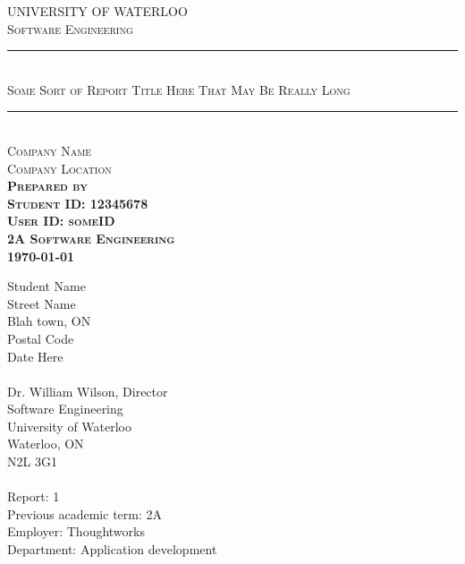\documentclass[pdftex,12pt,a4paper]{article}
\newcommand{\HRule}{\rule{\linewidth}{0.5mm}}
\begin{document}
\begin{titlepage}
\begin{center}

\textsc{\large UNIVERSITY OF WATERLOO} \\ [0.5 cm]
\textsc{\large Software Engineering} \\ [4.0 cm]

\HRule \\ [0.4 cm]
\textsc{\huge Some Sort of Report Title Here That May Be Really Long} \\ [0.4 cm]
\HRule \\ [4.0 cm]

\textsc{Company Name} \\
\textsc{Company Location} \\

\textsc \bf{Prepared by} \\ [0.3 cm]
\textsc {Student ID: 12345678} \\
\textsc {User ID: someID} \\
\textsc {2A Software Engineering} \\
{\large \today}

\end{center}
\end{titlepage}


\setcounter{page}{2}
\thispagestyle{empty}

Student Name \\
Street Name \\
Blah town, ON \\
Postal Code \\

Date Here \\
\\
Dr. William Wilson, Director \\
Software Engineering \\
University of Waterloo \\
Waterloo, ON \\
N2L 3G1 \\
\\
Report: 1 \\
Previous academic term: 2A \\
Employer: Thoughtworks \\
Department: Application development \\
\end{document}
